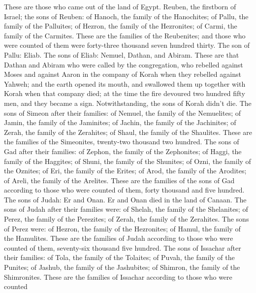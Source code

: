 These are those who came out of the land of Egypt. 
Reuben, the firstborn of Israel; the sons of Reuben: of Hanoch, the
family of the Hanochites; of Pallu, the family of the Palluites;
 of Hezron, the family of the Hezronites; of Carmi, the
family of the Carmites.  These are the families of the
Reubenites; and those who were counted of them were forty-three thousand
seven hundred thirty.  The son of Pallu: Eliab.
 The sons of Eliab: Nemuel, Dathan, and Abiram. These are
that Dathan and Abiram who were called by the congregation, who rebelled
against Moses and against Aaron in the company of Korah when they
rebelled against Yahweh;  and the earth opened its mouth,
and swallowed them up together with Korah when that company died; at the
time the fire devoured two hundred fifty men, and they became a sign.
 Notwithstanding, the sons of Korah didn't die.
 The sons of Simeon after their families: of Nemuel, the
family of the Nemuelites; of Jamin, the family of the Jaminites; of
Jachin, the family of the Jachinites;  of Zerah, the
family of the Zerahites; of Shaul, the family of the Shaulites.
 These are the families of the Simeonites, twenty-two
thousand two hundred.  The sons of Gad after their
families: of Zephon, the family of the Zephonites; of Haggi, the family
of the Haggites; of Shuni, the family of the Shunites; 
of Ozni, the family of the Oznites; of Eri, the family of the Erites;
 of Arod, the family of the Arodites; of Areli, the
family of the Arelites.  These are the families of the
sons of Gad according to those who were counted of them, forty thousand
and five hundred.  The sons of Judah: Er and Onan. Er and
Onan died in the land of Canaan.  The sons of Judah after
their families were: of Shelah, the family of the Shelanites; of Perez,
the family of the Perezites; of Zerah, the family of the Zerahites.
 The sons of Perez were: of Hezron, the family of the
Hezronites; of Hamul, the family of the Hamulites.  These
are the families of Judah according to those who were counted of them,
seventy-six thousand five hundred.  The sons of Issachar
after their families: of Tola, the family of the Tolaites; of Puvah, the
family of the Punites;  of Jashub, the family of the
Jashubites; of Shimron, the family of the Shimronites. 
These are the families of Issachar according to those who were counted

